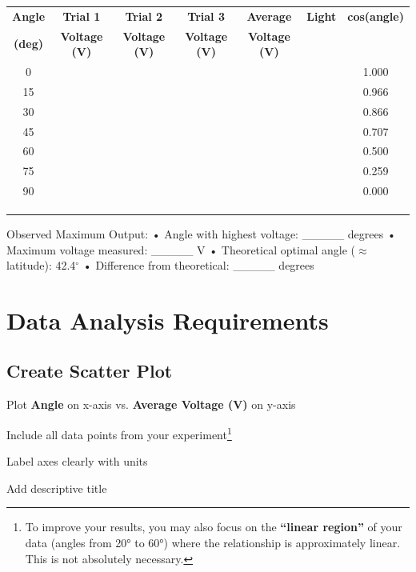 \documentclass[11pt,twoside]{article}
\numberwithin{equation}{section}
\newcommand{\?}{\stackrel{?}{=}}
\begin{document}
\vspace{0.5cm}

\begin{table}[h]
\centering
\small
\begin{tabular}{|c|c|c|c|c|c|c|}
\hline
\textbf{Angle} & \textbf{Trial 1} & \textbf{Trial 2} & \textbf{Trial 3} & \textbf{Average} & \textbf{Light} & \textbf{cos(angle)} \\
\textbf{(deg)} & \textbf{Voltage (V)} & \textbf{Voltage (V)} & \textbf{Voltage (V)} & \textbf{Voltage (V)} & \\
\hline
0 & & & & & & 1.000 \\
\hline
15 & & & & & & 0.966 \\
\hline
30 & & & & & & 0.866 \\
\hline
\rowcolor{green!20}
45 & & & & & & 0.707 \\
\hline
60 & & & & & & 0.500 \\
\hline
75 & & & & & & 0.259 \\
\hline
90 & & & & & & 0.000 \\
\hline
& & & & & & \\
\hline
& & & & & & \\
\hline
& & & & & & \\
\hline
\end{tabular}
\end{table}


\vspace{0.3cm}

\begin{calculationbox}
Observed Maximum Output:
• Angle with highest voltage: \_\_\_\_\_ degrees
• Maximum voltage measured: \_\_\_\_\_ V
• Theoretical optimal angle ($\approx$ latitude): 42.4$^\circ$
• Difference from theoretical: \_\_\_\_\_ degrees
\end{calculationbox}

\section{Data Analysis Requirements}


\subsection{Create Scatter Plot}
Plot \textbf{Angle} on x-axis vs. \textbf{Average Voltage (V)} on y-axis
\begin{compactitem}
    \item Include all data points from your experiment\footnote{To improve your results, you may also focus on the \textbf{``linear region''} of your data (angles from 20° to 60°) where the relationship is approximately linear.
    This is not absolutely necessary.}
    \item Label axes clearly with units
    \item Add descriptive title
\end{compactitem}
\end{document}
